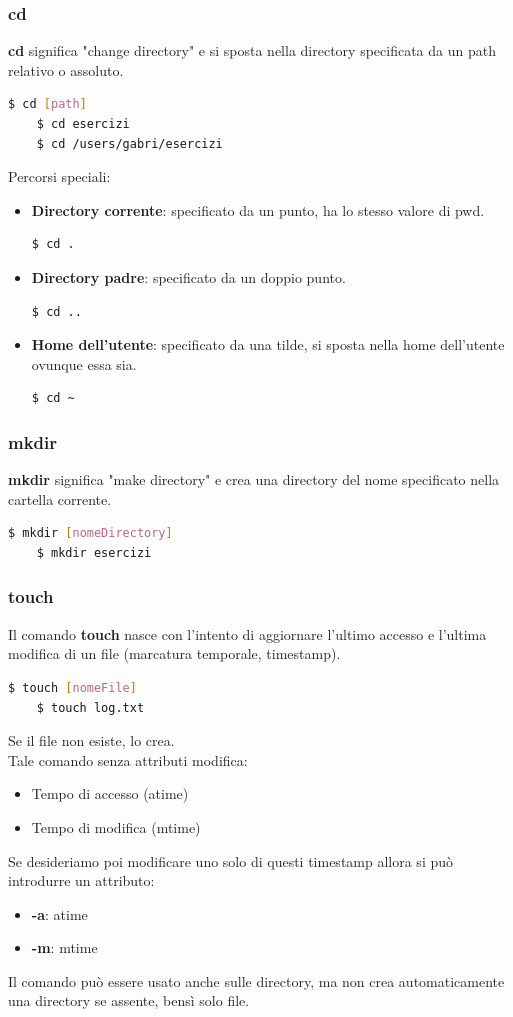 \documentclass[12pt,a4paper]{article}
\begin{document}
\subsubsection{cd}
\textbf{cd} significa "change directory" e si sposta nella directory specificata da un path relativo o assoluto.
\begin{lstlisting}[language=bash]
    $ cd [path]
    $ cd esercizi
    $ cd /users/gabri/esercizi
\end{lstlisting}
Percorsi speciali:
\begin{itemize}
    \item \textbf{Directory corrente}: specificato da un punto, ha lo stesso valore di pwd.
    \begin{lstlisting}[language=bash]
       $ cd .
    \end{lstlisting}
    \item \textbf{Directory padre}: specificato da un doppio punto.
    \begin{lstlisting}[language=bash]
       $ cd ..
    \end{lstlisting}
    \item \textbf{Home dell'utente}: specificato da una tilde, si sposta nella home dell'utente ovunque essa sia.
    \begin{lstlisting}[language=bash]
        $ cd ~
    \end{lstlisting}
\end{itemize}
\subsubsection{mkdir}
\textbf{mkdir} significa "make directory" e crea una directory del nome specificato nella cartella corrente.
\begin{lstlisting}[language=bash]
    $ mkdir [nomeDirectory]
    $ mkdir esercizi
\end{lstlisting}
\subsubsection{touch}
Il comando \textbf{touch} nasce con l'intento di aggiornare l'ultimo accesso e l'ultima modifica di un file (marcatura temporale, timestamp).
\begin{lstlisting}[language=bash]
    $ touch [nomeFile]
    $ touch log.txt
\end{lstlisting}
Se il file non esiste, lo crea.\\
Tale comando senza attributi modifica:
\begin{itemize}
    \item Tempo di accesso (atime)
    \item Tempo di modifica (mtime)
\end{itemize}
Se desideriamo poi modificare uno solo di questi timestamp allora si può introdurre un attributo:
\begin{itemize}
    \item \textbf{-a}: atime
    \item \textbf{-m}: mtime
\end{itemize}
Il comando può essere usato anche sulle directory, ma non crea automaticamente una directory se assente, bensì solo file.
\end{document}
